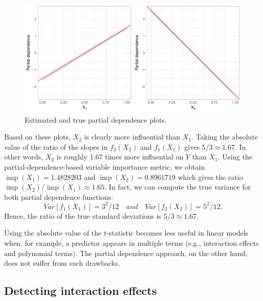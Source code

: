 \documentclass[12pt]{article}
\DeclareMathOperator{\imp}{imp}
\begin{document}
\begin{figure}[!htb]
  \centering
  \includegraphics[width=1.0\textwidth]{lm-pdps}
  \caption{Estimated and true partial dependence plots. \label{fig:lm-pdps}}
\end{figure}

Based on these plots, $X_2$ is clearly more influential than $X_1$. Taking the absolute value of the ratio of the slopes in $f_2\left(X_2\right)$ and $f_1\left(X_1\right)$ gives $5 / 3 \approx 1.67$. In other words, $X_2$ is roughly 1.67 times more influential on $Y$ than $X_1$. Using the partial-dependence-based variable importance metric, we obtain $\imp\left(X_1\right) = 1.4828203$ and $\imp\left(X_2\right) = 0.8961719$ which gives the ratio $\imp\left(X_2\right) / \imp\left(X_1\right) \approx 1.65$. In fact, we can compute the true variance for both partial dependence functions:
\begin{equation*}
Var\left[f_1\left(X_1\right)\right] = 3^2 / 12 \quad and \quad Var\left[f_2\left(X_2\right)\right] = 5^2 / 12.
\end{equation*}
Hence, the ratio of the true standard deviations is $5 / 3 \approx 1.67$.

Using the absolute value of the $t$-statistic becomes less useful in linear models when, for example, a predictor appears in multiple terms (e.g., interaction effects and polynomial terms). The partial dependence approach, on the other hand, does not suffer from such drawbacks.


\subsection{Detecting interaction effects}
\label{sec:interaction}
\end{document}
